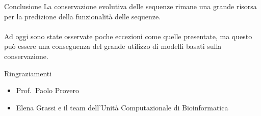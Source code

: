 \documentclass{beamer}
\begin{document}

    \begin{frame}[plain]{Conclusione}
        La conservazione evolutiva delle sequenze rimane una grande risorsa
        per la predizione della funzionalità delle sequenze.\\~\\
        Ad oggi sono state osservate poche eccezioni come quelle presentate,
        ma questo può essere una conseguenza del grande utilizzo di modelli basati sulla
        conservazione.\\
    \end{frame}


    \begin{frame}[plain]{Ringraziamenti}
        \begin{itemize}
            \item Prof.\ Paolo Provero
            \item Elena Grassi e il team dell'Unità Computazionale di Bioinformatica
        \end{itemize}
    \end{frame}
\end{document}
